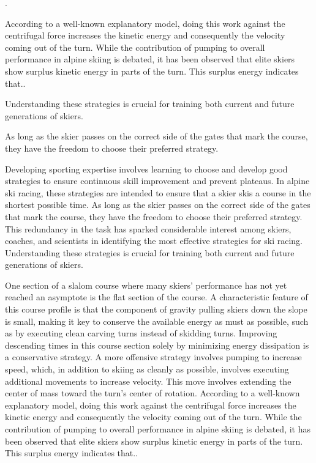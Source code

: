 \documentclass{article}
\begin{document}
 .


According to a well-known explanatory model, doing this work against the centrifugal force increases the kinetic energy and consequently the velocity coming out of the turn. While the contribution of pumping to overall performance in alpine skiing is debated, it has been observed that elite skiers show surplus kinetic energy in parts of the turn. This surplus energy indicates that..




 

Understanding these strategies is crucial for training both current and future generations of skiers.



As long as the skier passes on the correct side of the gates that mark the course, they have the freedom to choose their preferred strategy. 





Developing sporting expertise involves learning to choose and develop good strategies to ensure continuous skill improvement and prevent plateaus. In alpine ski racing, these strategies are intended to ensure that a skier skis a course in the shortest possible time. As long as the skier passes on the correct side of the gates that mark the course, they have the freedom to choose their preferred strategy. This redundancy in the task has sparked considerable interest among skiers, coaches, and scientists in identifying the most effective strategies for ski racing. Understanding these strategies is crucial for training both current and future generations of skiers.

One section of a slalom course where many skiers' performance has not yet reached an asymptote is the flat section of the course. A characteristic feature of this course profile is that the component of gravity pulling skiers down the slope is small, making it key to conserve the available energy as must as possible, such as by executing clean carving turns instead of skidding turns. Improving descending times in this course section solely by minimizing energy dissipation is a conservative strategy. A more offensive strategy involves pumping to increase speed, which, in addition to skiing as cleanly as possible, involves executing additional movements to increase velocity. This move involves extending the center of mass toward the turn's center of rotation. According to a well-known explanatory model, doing this work against the centrifugal force increases the kinetic energy and consequently the velocity coming out of the turn. While the contribution of pumping to overall performance in alpine skiing is debated, it has been observed that elite skiers show surplus kinetic energy in parts of the turn. This surplus energy indicates that..
\end{document}
